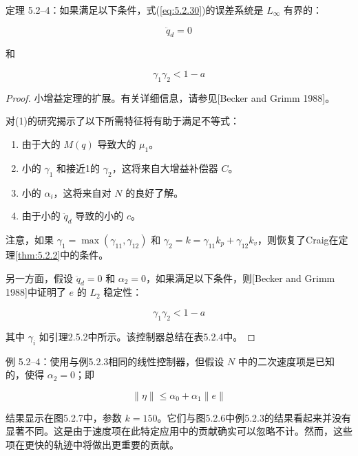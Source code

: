 \documentclass[UTF8,12pt,a4paper]{ctexart}
\begin{document}
\begin{theorem}\label{thm:5.2.4}
定理 5.2--4：如果满足以下条件，式(\ref{eq:5.2.30})的误差系统是 $L_\infty$ 有界的：

\begin{equation}
\ddot{q}_d = 0
\end{equation}

和

\begin{equation}
\gamma_1\gamma_2 < 1 - a
\end{equation}
\end{theorem}

\begin{proof}
小增益定理的扩展。有关详细信息，请参见[Becker and Grimm 1988]。

对(1)的研究揭示了以下所需特征将有助于满足不等式：
\begin{enumerate}
    \item 由于大的 $M(q)$ 导致大的 $\mu_1$。
    \item 小的 $\gamma_1$ 和接近1的 $\gamma_2$，这将来自大增益补偿器 $C$。
    \item 小的 $\alpha_i$，这将来自对 $N$ 的良好了解。
    \item 由于小的 $\ddot{q}_d$ 导致的小的 $c$。
\end{enumerate}

注意，如果 $\gamma_1 = \max(\gamma_{11}, \gamma_{12})$ 和 $\gamma_2 = k = \gamma_{11}k_p + \gamma_{12}k_v$，则恢复了Craig在定理\ref{thm:5.2.2}中的条件。

另一方面，假设 $\ddot{q}_d = 0$ 和 $\alpha_2 = 0$，如果满足以下条件，则[Becker and Grimm 1988]中证明了 $e$ 的 $L_2$ 稳定性：

\begin{equation}\label{eq:5.2.36}
\gamma_1\gamma_2 < 1 - a
\end{equation}

其中 $\gamma_i$ 如引理2.5.2中所示。该控制器总结在表5.2.4中。
\end{proof}

\begin{example}[动态一自由度设计]
例 5.2--4：使用与例5.2.3相同的线性控制器，但假设 $N$ 中的二次速度项是已知的，使得 $\alpha_2 = 0$；即

\begin{equation}
\|\eta\| \leq \alpha_0 + \alpha_1\|e\|
\end{equation}

结果显示在图5.2.7中，参数 $k = 150$。它们与图5.2.6中例5.2.3的结果看起来并没有显著不同。这是由于速度项在此特定应用中的贡献确实可以忽略不计。然而，这些项在更快的轨迹中将做出更重要的贡献。
\end{example}
\end{document}
